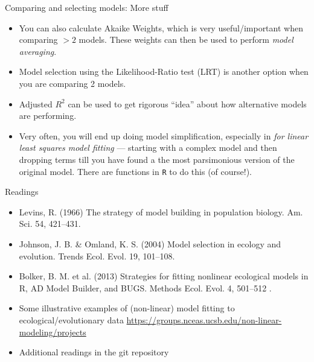 \documentclass[xcolor=x11names,compress]{beamer}
\renewcommand{\(}{\begin{columns}}
\renewcommand{\)}{\end{columns}}
\newcommand{\<}[1]{\begin{column}{#1}}
\renewcommand{\>}{\end{column}}
\begin{document}
\begin{frame}{Comparing and selecting models: More stuff}

\begin{itemize} \itemsep12pt
	\item You can also calculate Akaike Weights, which is very useful/important
	when comparing $ > 2$ models. These weights can then be used to perform {\it
	model averaging}.

	\item Model selection using the Likelihood-Ratio test (LRT) is another
	option when you are comparing 2 models.
	
	\item Adjusted $R^2$ can be used to get rigorous ``idea'' about how
	alternative models are performing. 
	
	\item Very often, you will end up doing  model simplification, especially in
	{\it for linear least squares model fitting} --- starting with a complex
	model and then dropping terms till you have found a the most parsimonious
	version of the original model. There are functions in {\tt R} to do this (of
	course!).
 
\end{itemize}

\end{frame}

\begin{frame}{Readings}

\begin{itemize}

\item Levins, R. (1966) The strategy of model building in population 
biology. Am. Sci. 54, 421--431.  

\item Johnson, J. B. \& Omland, K. S. (2004) Model selection in ecology 
and evolution. Trends Ecol. Evol. 19, 101--108. 

\item Bolker, B. M. et al.  (2013) Strategies for fitting nonlinear ecological models in R, AD Model Builder, and BUGS. Methods Ecol. Evol. 4, 501--512 .

\item Some illustrative examples of (non-linear) model fitting to 
ecological/evolutionary data 
\url{https://groups.nceas.ucsb.edu/non-linear-modeling/projects} 

\item Additional readings in the git repository
 
\end{itemize}
\end{frame}
\end{document}
